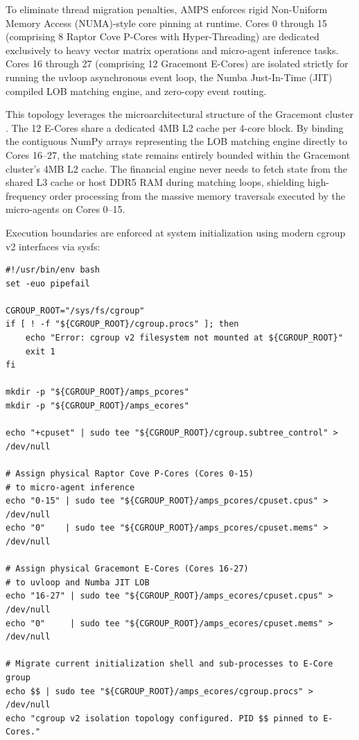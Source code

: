To eliminate thread migration penalties, AMPS enforces rigid Non-Uniform Memory Access (NUMA)-style core pinning at runtime. Cores 0 through 15 (comprising 8 Raptor Cove P-Cores with Hyper-Threading) are dedicated exclusively to heavy vector matrix operations and micro-agent inference tasks. Cores 16 through 27 (comprising 12 Gracemont E-Cores) are isolated strictly for running the uvloop asynchronous event loop, the Numba Just-In-Time (JIT) compiled LOB matching engine, and zero-copy event routing.

This topology leverages the microarchitectural structure of the Gracemont cluster \cite{intel2024optimization}. The 12 E-Cores share a dedicated 4MB L2 cache per 4-core block. By binding the contiguous NumPy arrays representing the LOB matching engine directly to Cores 16--27, the matching state remains entirely bounded within the Gracemont cluster's 4MB L2 cache. The financial engine never needs to fetch state from the shared L3 cache or host DDR5 RAM during matching loops, shielding high-frequency order processing from the massive memory traversals executed by the micro-agents on Cores 0--15.

Execution boundaries are enforced at system initialization using modern cgroup v2 interfaces via sysfs:

\vspace{\baselineskip}

\label{listing:cgroup_isolation}
\begin{verbatim}
#!/usr/bin/env bash
set -euo pipefail

CGROUP_ROOT="/sys/fs/cgroup"
if [ ! -f "${CGROUP_ROOT}/cgroup.procs" ]; then
    echo "Error: cgroup v2 filesystem not mounted at ${CGROUP_ROOT}"
    exit 1
fi

mkdir -p "${CGROUP_ROOT}/amps_pcores"
mkdir -p "${CGROUP_ROOT}/amps_ecores"

echo "+cpuset" | sudo tee "${CGROUP_ROOT}/cgroup.subtree_control" > /dev/null

# Assign physical Raptor Cove P-Cores (Cores 0-15)
# to micro-agent inference
echo "0-15" | sudo tee "${CGROUP_ROOT}/amps_pcores/cpuset.cpus" > /dev/null
echo "0"    | sudo tee "${CGROUP_ROOT}/amps_pcores/cpuset.mems" > /dev/null

# Assign physical Gracemont E-Cores (Cores 16-27)
# to uvloop and Numba JIT LOB
echo "16-27" | sudo tee "${CGROUP_ROOT}/amps_ecores/cpuset.cpus" > /dev/null
echo "0"     | sudo tee "${CGROUP_ROOT}/amps_ecores/cpuset.mems" > /dev/null

# Migrate current initialization shell and sub-processes to E-Core group
echo $$ | sudo tee "${CGROUP_ROOT}/amps_ecores/cgroup.procs" > /dev/null
echo "cgroup v2 isolation topology configured. PID $$ pinned to E-Cores."
\end{verbatim}
\par\vspace*{\baselineskip}

